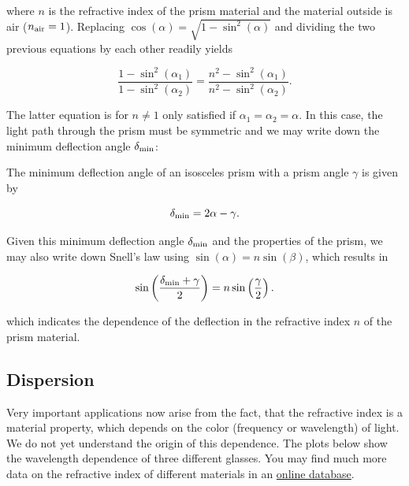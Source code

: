 \documentclass[
  a4paper,
]{book}
\begin{document}
where \(n\) is the refractive index of the prism material and the
material outside is air (\(n_{\rm air}=1\)). Replacing
\(\cos(\alpha)=\sqrt{1-\sin^2(\alpha)}\) and dividing the two previous
equations by each other readily yields

\[\frac{1-\sin^2(\alpha_1)}{1-\sin^2(\alpha_2)}=\frac{n^2-\sin^2(\alpha_1)}{n^2-\sin^2(\alpha_2)}.\]

The latter equation is for \(n\neq 1\) only satisfied if
\(\alpha_1=\alpha_2=\alpha\). In this case, the light path through the
prism must be symmetric and we may write down the minimum deflection
angle \(\delta_{\rm min}\):

\begin{tcolorbox}[enhanced jigsaw, coltitle=black, title=\textcolor{quarto-callout-note-color}{\faInfo}\hspace{0.5em}{Minimum prism deflection}, colframe=quarto-callout-note-color-frame, toprule=.15mm, opacitybacktitle=0.6, left=2mm, opacityback=0, breakable, toptitle=1mm, bottomtitle=1mm, leftrule=.75mm, arc=.35mm, titlerule=0mm, colbacktitle=quarto-callout-note-color!10!white, rightrule=.15mm, bottomrule=.15mm, colback=white]

The minimum deflection angle of an isosceles prism with a prism angle
\(\gamma\) is given by

\[\delta_{\rm min}=2\alpha-\gamma.\]

\end{tcolorbox}

Given this minimum deflection angle \(\delta_{\rm min}\) and the
properties of the prism, we may also write down Snell's law using
\(\sin(\alpha)=n\sin(\beta)\), which results in

\[\sin \left ( \frac{\delta_{\rm min}+\gamma}{2}\right )=n\sin\left (\frac{\gamma}{2}\right).\]

which indicates the dependence of the deflection in the refractive index
\(n\) of the prism material.

\subsection{Dispersion}\label{dispersion}

Very important applications now arise from the fact, that the refractive
index is a material property, which depends on the color (frequency or
wavelength) of light. We do not yet understand the origin of this
dependence. The plots below show the wavelength dependence of three
different glasses. You may find much more data on the refractive index
of different materials in an \href{https://refractiveindex.info/}{online
database}.
\end{document}
